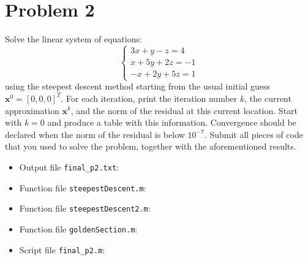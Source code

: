 \section{Problem 2}%
\label{sec:problem_2}
Solve the linear system of equations:
\begin{equation*}
  \begin{cases}
    3x + y - z = 4 \\
    x + 5y + 2z = -1 \\
    -x + 2y + 5z = 1
  \end{cases}
\end{equation*}
using the steepest descent method starting from the usual initial guess $\mathbf{x}^{0} = [0, 0, 0]^{T}$. For each iteration, print the iteration number $k$, the current approximation $\mathbf{x}^{k}$, and the norm of the residual at this current location. Start with $k = 0$ and produce a table with this information. Convergence should be declared when the norm of the residual is below $10^{-7}$. Submit all pieces of code that you used to solve the problem, together with the aforementioned results.
\begin{solution}
  \quad
  \begin{itemize}
  \item Output file \verb|final_p2.txt|:
    
  \item Function file \verb|steepestDescent.m|:
    
  \item Function file \verb|steepestDescent2.m|:
    
  \item Function file \verb|goldenSection.m|:
    
  \item Script file \verb|final_p2.m|:
    
  \end{itemize}
\end{solution}

